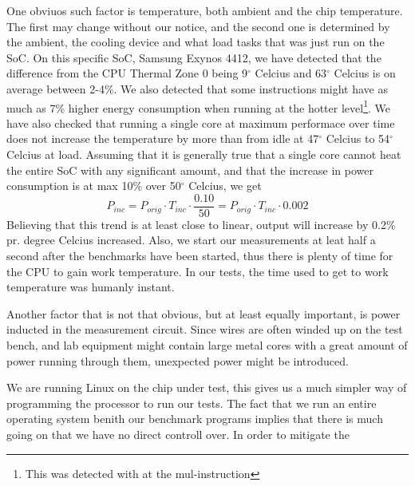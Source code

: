 One obviuos such factor is temperature, both ambient and
the chip temperature. The first may change without our notice, and the second one is
determined by the ambient, the cooling device and what load tasks that was just run on
the SoC. On this specific SoC, Samsung Exynos 4412, we have detected that the difference
from the CPU Thermal Zone 0 being 9$^\circ$ Celcius and 63$^\circ$ Celcius is on average
between 2-4\%. We also detected that some instructions might have as much as 7\% higher
energy consumption when running at the hotter level\footnote{This was detected with at
the {\ttfamily mul}-instruction}. We have also checked that running a single core at
maximum performace over time does not increase the temperature by more than from
idle at 47$^\circ$ Celcius to 54$^\circ$ Celcius at load. Assuming that it is generally
true that a single core cannot heat the entire SoC with any significant amount, and that
the increase in power consumption is at max 10\% over 50$^\circ$ Celcius, we get
\begin{equation}
    P_{inc} = P_{orig} \cdot T_{inc} \cdot \frac{0.10}{50} = P_{orig} \cdot T_{inc} \cdot 0.002
\end{equation}
Believing that this trend is at least close to linear, output will increase by 0.2\% pr.
degree Celcius increased. Also, we start our measurements at leat half a second after the benchmarks
have been started, thus there is plenty of time for the CPU to gain work temperature. In our
tests, the time used to get to work temperature was humanly instant.

Another factor that is not that obvious, but at least equally important, is power inducted
in the measurement circuit. Since wires are often winded up on the test bench, and lab equipment
might contain large metal cores with a great amount of power running through them, unexpected
power might be introduced.

We are running Linux on the chip under test, this gives us a much simpler way of programming
the processor to run our tests. The fact that we run an entire operating system benith our
benchmark programs implies that there is much going on that we have no direct controll over.
In order to mitigate the 
